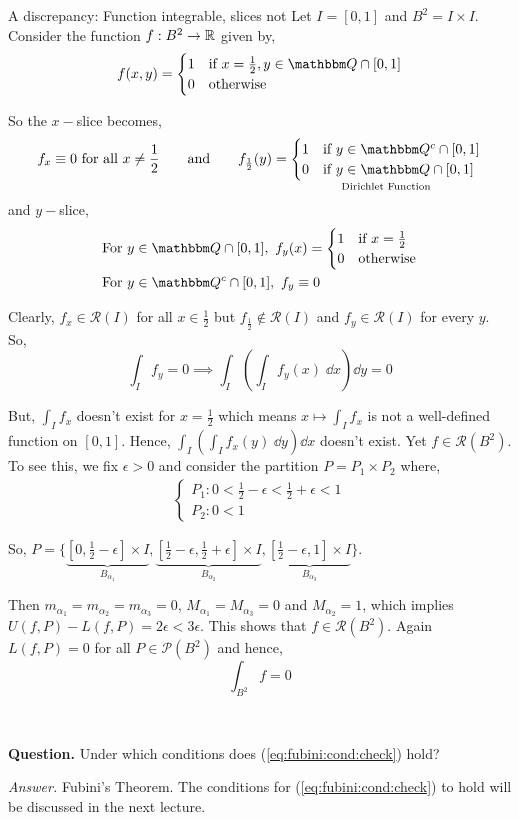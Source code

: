 \documentclass[../Analysis-3.tex]{subfiles}
\begin{document}
\begin{Eg}{A discrepancy: Function integrable, slices not}{}
  Let $ I = [0,1] $ and $ B^2 = I \times I $. Consider the function $ f:B^2 \to \mathbb{R} $ given by,
  \[  f(x,y) = \begin{cases}
      1 & \text{if } x = \frac 12, y \in \Q \cap [0,1] \\
      0 & \text{otherwise}
    \end{cases}  \]

  So the $x-$slice becomes,
  \[  f_x \equiv 0 \text{ for all } x \neq \frac 12 \qquad \text{and} \qquad f_{\frac 12}(y) = \underset{\text{Dirichlet Function}}{\begin{cases}
        1 & \text{if } y \in \Q^c \cap [0,1] \\
        0 & \text{if } y \in \Q \cap [0,1]
      \end{cases}} \]
  and $y-$slice,
  \begin{align*}
     & \text{For } y \in \Q \cap [0,1], \ f_y(x) = \begin{cases}
                                                     1 & \text{if } x = \frac 12 \\
                                                     0 & \text{otherwise}
                                                   \end{cases} \\
     & \text{For } y \in \Q^c \cap [0,1], \ f_y \equiv 0
  \end{align*}

  Clearly, $ f_x \in \mathscr{R}(I) $ for all $ x \in \frac 12 $ but $ f_{\frac 12} \not\in \mathscr{R}(I) $ and $ f_y \in \mathscr{R}(I) $ for every $ y $. So,
  \[  \int_I f_y = 0 \implies \int_I \left( \int_I f_y(x) \; \dd x \right) \dd y = 0 \]

  But, $ \displaystyle\int_I f_x $ doesn't exist for $ x = \frac 12 $ which means $ \displaystyle x \longmapsto \int_I f_x $ is not a well-defined function on $ [0,1] $. Hence, $ \displaystyle\int_I \left( \int_I f_x(y) \; \dd y \right) \dd x $ doesn't exist. Yet $ f \in \mathscr{R}(B^2) $. To see this, we fix $ \epsilon > 0 $ and consider the partition $ P = P_1 \times P_2 $ where,
  \begin{align*}
    \begin{cases}
      P_1: 0 < \frac 12 - \epsilon < \frac 12 + \epsilon < 1 \\
      P_2: 0 < 1
    \end{cases}
  \end{align*}

  So, $ P = \Bigg\{ \underbrace{\left[ 0, \frac 12 - \epsilon \right] \times I}_{B_{\alpha_1}}, \underbrace{\left[\frac 12 - \epsilon, \frac 12 + \epsilon \right] \times I}_{B_{\alpha_2}}, \underbrace{\left[\frac 12 - \epsilon, 1 \right] \times I}_{B_{\alpha_3}} \Bigg\} $.

  Then $ m_{\alpha_1} = m_{\alpha_{2}} = m_{\alpha_3} = 0 $, $ M_{\alpha_1} = M_{\alpha_3} = 0 $ and $ M_{\alpha_2} = 1 $, which implies $ U(f,P) - L(f,P) = 2\epsilon < 3\epsilon $. This shows that $ f \in \mathscr{R}(B^2) $. Again $ L(f,P) = 0 $ for all $ P \in \mathscr{P}(B^2) $ and hence,
  \[  \int_{B^2} f = 0  \]
\end{Eg}

\

\textbf{Question.} Under which conditions does (\ref{eq:fubini:cond:check}) hold?

\textit{Answer.} Fubini's Theorem. The conditions for (\ref{eq:fubini:cond:check}) to hold will be discussed in the next lecture.
\end{document}
